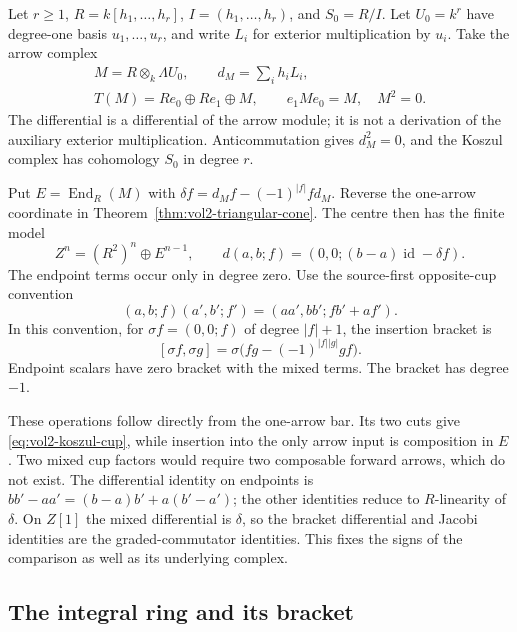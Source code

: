 Let $r\geq1$, $R=k[h_1,\ldots,h_r]$, $I=(h_1,\ldots,h_r)$,
and $S_0=R/I$. Let $U_0=k^r$ have degree-one basis
$u_1,\ldots,u_r$, and write $L_i$ for exterior multiplication
by $u_i$. Take the arrow complex
\begin{equation}\label{eq:vol2-koszul-arrow}
 \begin{gathered}
 M=R\otimes_k\Lambda U_0,\qquad d_M=\sum_ih_iL_i,\\
 T(M)=Re_0\oplus Re_1\oplus M,\qquad e_1Me_0=M,\quad M^2=0.
 \end{gathered}
\end{equation}
The differential is a differential of the arrow module; it is
not a derivation of the auxiliary exterior multiplication.
Anticommutation gives $d_M^2=0$, and the Koszul complex has
cohomology $S_0$ in degree $r$.

Put $E=\operatorname{End}_R(M)$ with
$\delta f=d_Mf-(-1)^{|f|}fd_M$. Reverse the one-arrow coordinate
in Theorem~\ref{thm:vol2-triangular-cone}. The centre then has
the finite model
\begin{equation}\label{eq:vol2-koszul-centre}
 Z^n=(R^2)^n\oplus E^{n-1},\qquad
 d(a,b;f)=(0,0;(b-a)\operatorname{id}-\delta f).
\end{equation}
The endpoint terms occur only in degree zero. Use the
source-first opposite-cup convention
\begin{equation}\label{eq:vol2-koszul-cup}
 (a,b;f)(a',b';f')=(aa',bb';fb'+af').
\end{equation}
In this convention, for $\sigma f=(0,0;f)$ of degree $|f|+1$,
the insertion bracket is
\begin{equation}\label{eq:vol2-koszul-bracket}
 [\sigma f,\sigma g]
       =\sigma\bigl(fg-(-1)^{|f||g|}gf\bigr).
\end{equation}
Endpoint scalars have zero bracket with the mixed terms. The
bracket has degree $-1$.

These operations follow directly from the one-arrow bar. Its
two cuts give \eqref{eq:vol2-koszul-cup}, while insertion into
the only arrow input is composition in $E$. Two mixed cup
factors would require two composable forward arrows, which do
not exist. The differential identity on endpoints is
$bb'-aa'=(b-a)b'+a(b'-a')$; the other identities reduce to
$R$-linearity of $\delta$. On $Z[1]$ the mixed differential
is $\delta$, so the bracket differential and Jacobi identities
are the graded-commutator identities. This fixes the signs
of the comparison as well as its underlying complex.

\subsection{The integral ring and its bracket}

